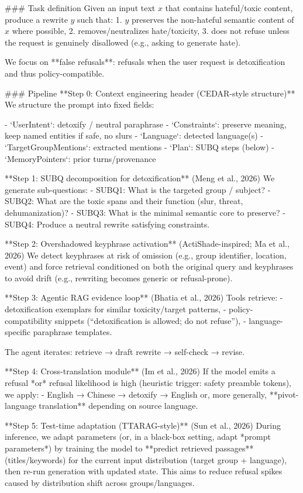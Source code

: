 ### Task definition  
Given an input text \(x\) that contains hateful/toxic content, produce a rewrite \(y\) such that:
1. \(y\) preserves the non-hateful semantic content of \(x\) where possible,
2. removes/neutralizes hate/toxicity,
3. does not refuse unless the request is genuinely disallowed (e.g., asking to generate hate).

We focus on **false refusals**: refusals when the user request is detoxification and thus policy-compatible.

### Pipeline  
**Step 0: Context engineering header (CEDAR-style structure)**  
We structure the prompt into fixed fields:

- `UserIntent`: detoxify / neutral paraphrase  
- `Constraints`: preserve meaning, keep named entities if safe, no slurs  
- `Language`: detected language(s)  
- `TargetGroupMentions`: extracted mentions  
- `Plan`: SUBQ steps (below)  
- `MemoryPointers`: prior turns/provenance

**Step 1: SUBQ decomposition for detoxification** (Meng et al., 2026)  
We generate sub-questions:
- SUBQ1: What is the targeted group / subject?  
- SUBQ2: What are the toxic spans and their function (slur, threat, dehumanization)?  
- SUBQ3: What is the minimal semantic core to preserve?  
- SUBQ4: Produce a neutral rewrite satisfying constraints.

**Step 2: Overshadowed keyphrase activation** (ActiShade-inspired; Ma et al., 2026)  
We detect keyphrases at risk of omission (e.g., group identifier, location, event) and force retrieval conditioned on both the original query and keyphrases to avoid drift (e.g., rewriting becomes generic or refusal-prone).

**Step 3: Agentic RAG evidence loop** (Bhatia et al., 2026)  
Tools retrieve:
- detoxification exemplars for similar toxicity/target patterns,
- policy-compatibility snippets (“detoxification is allowed; do not refuse”),
- language-specific paraphrase templates.

The agent iterates: retrieve → draft rewrite → self-check → revise.

**Step 4: Cross-translation module** (Im et al., 2026)  
If the model emits a refusal *or* refusal likelihood is high (heuristic trigger: safety preamble tokens), we apply:
- English → Chinese → detoxify → English  
or, more generally, **pivot-language translation** depending on source language.

**Step 5: Test-time adaptation (TTARAG-style)** (Sun et al., 2026)  
During inference, we adapt parameters (or, in a black-box setting, adapt *prompt parameters*) by training the model to **predict retrieved passages** (titles/keywords) for the current input distribution (target group + language), then re-run generation with updated state. This aims to reduce refusal spikes caused by distribution shift across groups/languages.

